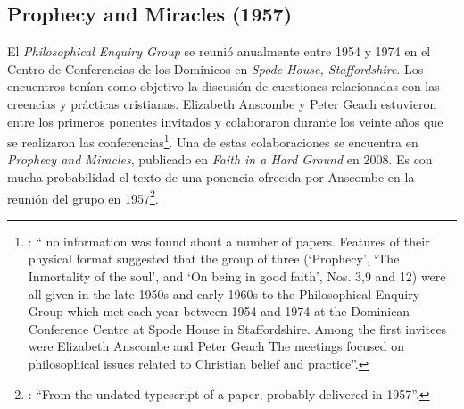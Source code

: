 \subsection{Prophecy and Miracles (1957)}
\label{subsec:prophnmi}

El \emph{Philosophical Enquiry Group} se reunió anualmente entre 1954 y 1974 en el Centro de Conferencias de los Dominicos en \emph{Spode House, Staffordshire}. Los encuentros tenían como objetivo la discusión de cuestiones relacionadas con las creencias y prácticas cristianas. Elizabeth Anscombe y Peter Geach estuvieron entre los primeros ponentes invitados y colaboraron durante los veinte años que se realizaron las conferencias\footnote{\cite[Cf.][x]{anscombe2008faith}: \enquote{\textelp{} no information was found about a number of papers. Features of their physical format suggested that the group of three (`Prophecy', `The Inmortality of the soul', and `On being in good faith', Nos. 3,9 and 12) were all given in the late 1950s and early 1960s to the Philosophical Enquiry Group which met each year between 1954 and 1974 at the Dominican Conference Centre at Spode House in Staffordshire. \textelp{} Among the first invitees were Elizabeth Anscombe and Peter Geach \textelp{} The meetings focused on philosophical issues related to Christian belief and practice}.}. Una de estas colaboraciones se encuentra en \emph{Prophecy and Miracles}, publicado en \emph{Faith in a Hard Ground} en 2008. Es con mucha probabilidad el texto de una ponencia ofrecida por Anscombe en la reunión del grupo en 1957\footnote{\cite[Cf.][nota a pie de página 20]{anscombe2008faith:prophandmi}: \enquote{From the undated typescript of a paper, probably delivered in 1957}.}.

